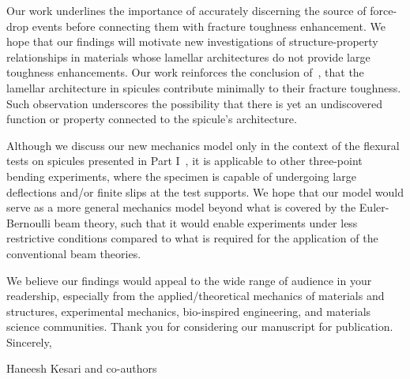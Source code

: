 \documentclass[11pt,letterpaper]{report}
\begin{document}
Our work underlines the importance of accurately discerning the source of force-drop events before connecting them with fracture toughness enhancement. We hope that our findings will motivate new investigations of structure-property relationships in materials whose lamellar architectures do
 not provide large toughness enhancements. Our work reinforces the conclusion of~\cite{monn2020lamellar}, that the lamellar architecture in spicules contribute minimally to their fracture toughness. Such observation underscores the possibility that there is yet an undiscovered function or property connected to the spicule's architecture.


Although we discuss our new mechanics model only in the context of the flexural tests on spicules presented in Part I~\cite{kochiyama2021sawtooth}, it is applicable to other three-point bending experiments, where the specimen is capable of undergoing large deflections and/or finite slips at the test supports. We hope that our model would serve as a more general mechanics model beyond what is covered by the Euler-Bernoulli beam theory, such that it would enable experiments under less restrictive conditions compared to what is required for the application of the conventional beam theories.

We believe our findings would appeal to the wide range of audience in your readership, especially from the applied/theoretical mechanics of materials and structures, experimental mechanics, bio-inspired engineering, and materials science communities. Thank you for considering our manuscript for publication.\\





Sincerely,

\vspace{5em}

Haneesh Kesari and co-authors




\end{document}
